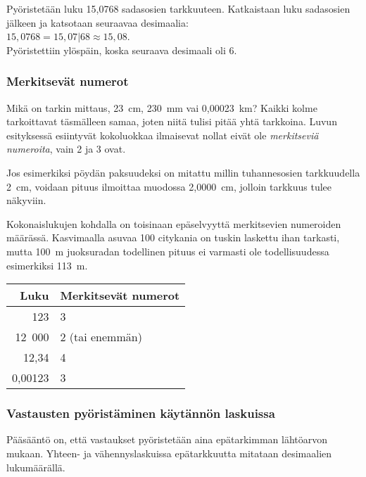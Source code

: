 \begin{esimerkki}
Pyöristetään luku 15,0768 sadasosien tarkkuuteen. Katkaistaan
luku sadasosien jälkeen ja katsotaan seuraavaa desimaalia:\\
$15,0768 = 15,07|68 \approx 15,08$.\\
Pyöristettiin ylöspäin, koska seuraava desimaali oli 6.
\end{esimerkki}

\subsubsection*{Merkitsevät numerot}

Mikä on tarkin mittaus, 23~cm, 230~mm vai 0,00023~km? Kaikki kolme tarkoittavat täsmälleen samaa, joten niitä tulisi pitää
yhtä tarkkoina. Luvun esityksessä esiintyvät kokoluokkaa ilmaisevat nollat eivät ole \emph{merkitseviä numeroita}, vain
2 ja 3 ovat.


Jos esimerkiksi pöydän paksuudeksi on mitattu millin tuhannesosien
tarkkuudella 2~cm, voidaan pituus ilmoittaa muodossa 2,0000~cm, jolloin tarkkuus tulee näkyviin. 

Kokonaislukujen kohdalla on toisinaan epäselvyyttä merkitsevien numeroiden määrässä. Kasvimaalla asuvaa 100 citykania on tuskin laskettu ihan tarkasti,
mutta 100~m juoksuradan todellinen pituus ei varmasti ole todellisuudessa
esimerkiksi 113~m.

\begin{center}
\begin{tabular}{r|l}
Luku & Merkitsevät numerot \\
\hline
123 & 3 \\
12~000 & 2 (tai enemmän)\\
12,34 & 4 \\
0,00123 & 3
\end{tabular}
\end{center}

\subsubsection*{Vastausten pyöristäminen käytännön laskuissa}

Pääsääntö on, että vastaukset pyöristetään aina epätarkimman
lähtöarvon mukaan. Yhteen- ja vähennyslaskuissa epätarkkuutta
mitataan desimaalien lukumäärällä.

